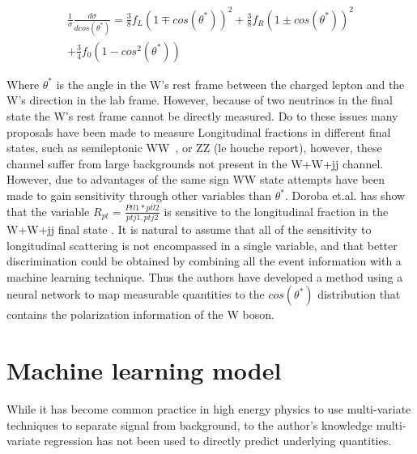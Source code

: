 \documentclass[10pt,twocolumn]{article}
\def\ts{\ensuremath{ \theta^{*} }\xspace}
\def\cts{\ensuremath{ cos(\ts) }\xspace}
\def\ctsSq{\ensuremath{ cos^{2}(\ts) }\xspace}
\begin{document}
\begin{multline}
 \frac{1}{\sigma} \frac{d\sigma}{d\cts} = \frac{3}{8} f_L (1 \mp \cts)^2 + \frac{3}{8} f_R (1 \pm \cts)^2 \\ 
+\frac{3}{4} f_0 (1 - \ctsSq)  
\end{multline}



Where \ts is the angle in the W's rest frame between the charged lepton and the W's direction in the lab frame. However, because of two neutrinos in the final state the W's rest frame cannot be directly measured. Do to these issues many proposals have been made to measure Longitudinal fractions in different final states, such as semileptonic WW~\cite{Han:2009em}, or ZZ (le houche report), however, these channel suffer from large backgrounds not present in the W+W+jj channel.  However, due to advantages of the same sign WW state attempts have been made to gain sensitivity through other variables than \ts. Doroba et.al. has show that the variable $R_{pt}=\frac{Ptl1*ptl2}{ptj1,ptj2}$  is sensitive to the longitudinal fraction in the W+W+jj final state \cite{Doroba:2012pd}.  It is natural to assume that all of the sensitivity to longitudinal scattering is not encompassed in a single variable, and that better discrimination could be obtained by combining all the event information with a machine learning technique. Thus the authors have developed a method using a neural network to map measurable quantities to the \cts distribution that contains the polarization information of the W boson. 



\section{Machine learning model}


While it has become common practice in high energy physics to use multi-variate techniques to separate signal 
from background, to the author's knowledge multi-variate regression has not been used to directly predict underlying quantities. 
\end{document}
